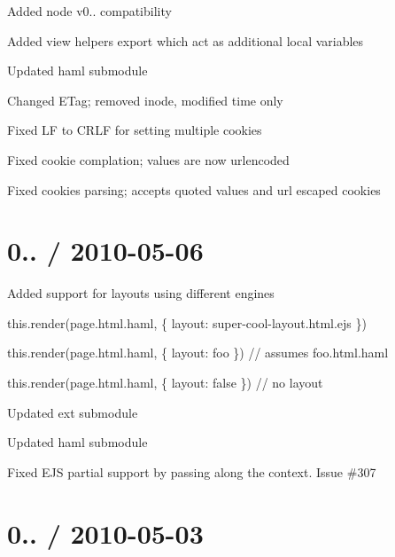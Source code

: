 {\ttfamily 
\begin{DoxyItemize}
\item Added node v0.. compatibility
\item Added view {\ttfamily helpers} export which act as additional local variables
\item Updated haml submodule
\item Changed E\+Tag; removed inode, modified time only
\item Fixed LF to C\+R\+LF for setting multiple cookies
\item Fixed cookie complation; values are now urlencoded
\item Fixed cookies parsing; accepts quoted values and url escaped cookies
\end{DoxyItemize}}

{\ttfamily \section*{0.. / 2010-\/05-\/06 }}

{\ttfamily }

{\ttfamily 
\begin{DoxyItemize}
\item Added support for layouts using different engines
\begin{DoxyItemize}
\item this.\+render(\textquotesingle{}page.\+html.\+haml\textquotesingle{}, \{ layout\+: \textquotesingle{}super-\/cool-\/layout.\+html.\+ejs\textquotesingle{} \})
\item this.\+render(\textquotesingle{}page.\+html.\+haml\textquotesingle{}, \{ layout\+: \textquotesingle{}foo\textquotesingle{} \}) // assumes \textquotesingle{}foo.\+html.\+haml\textquotesingle{}
\item this.\+render(\textquotesingle{}page.\+html.\+haml\textquotesingle{}, \{ layout\+: false \}) // no layout
\end{DoxyItemize}
\item Updated ext submodule
\item Updated haml submodule
\item Fixed E\+JS partial support by passing along the context. Issue \#307
\end{DoxyItemize}}

{\ttfamily \section*{0.. / 2010-\/05-\/03 }}

